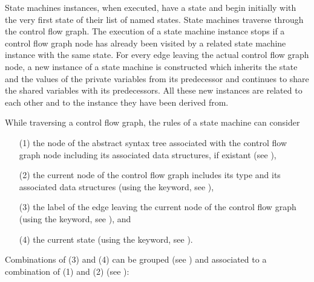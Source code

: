 State machines instances, when executed, have a state and begin initially
with the very first state of their list of named states. State machines
traverse through the control flow graph. The execution of a state
machine instance stops if a control flow graph node has already been
visited by a related state machine instance with the same state. For
every edge leaving the actual control flow graph node, a new instance of a
state machine is constructed which inherits the state and the values of
the private variables from its predecessor and continues to share the
shared variables with its predecessors. All these new instances are
related to each other and to the instance they have been derived from.

While traversing a control flow graph, the rules of a state machine
can consider

\begin{enumerate}
   \item[(1)] the node of the abstract syntax tree associated with the
      control flow graph node including its associated data structures,
      if existant (see ),
   \item[(2)] the current node of the control flow graph includes its
      type and its associated data structures
      (using the  keyword,
      see ),
   \item[(3)] the label of the edge leaving the current node of the control
      flow graph (using the  keyword,
      see ), and
   \item[(4)] the current state (using the  keyword,
      see ).
\end{enumerate}

\noindent
Combinations of (3) and (4) can be grouped (see
) and associated to a combination of (1)
and (2) (see ):

